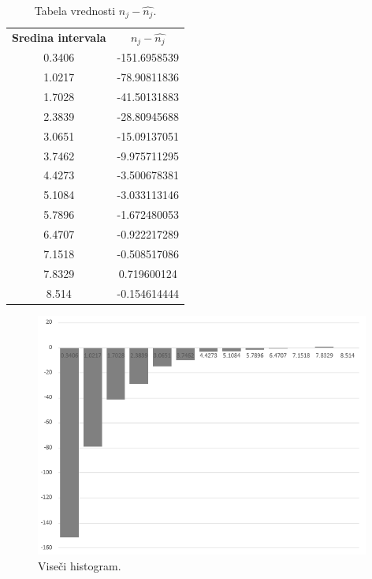 \documentclass{article}
\begin{document}
\begin{table}[H]
    \centering
    \begin{tabular}{c c}
        \bf{Sredina intervala}  &	$n_j - \hat{n_j}$   \\
        0.3406   &  	-151.6958539   \\
        1.0217   &  	-78.90811836   \\
        1.7028   &  	-41.50131883   \\
        2.3839   &  	-28.80945688   \\
        3.0651   &  	-15.09137051   \\
        3.7462   &  	-9.975711295   \\
        4.4273   &  	-3.500678381   \\
        5.1084   &  	-3.033113146   \\
        5.7896   &  	-1.672480053   \\
        6.4707   &  	-0.922217289   \\
        7.1518   &  	-0.508517086   \\
        7.8329   &  	 0.719600124   \\
        8.514    &  	-0.154614444   \\
    \end{tabular}
    \caption{Tabela vrednosti $n_j - \hat{n_j}$.}
\end{table}
\begin{figure}[H]
    \centering
    \includegraphics[height=8cm]{viseci-histogram-3.png}
    \caption{Viseči histogram.}
\end{figure}
\end{document}
